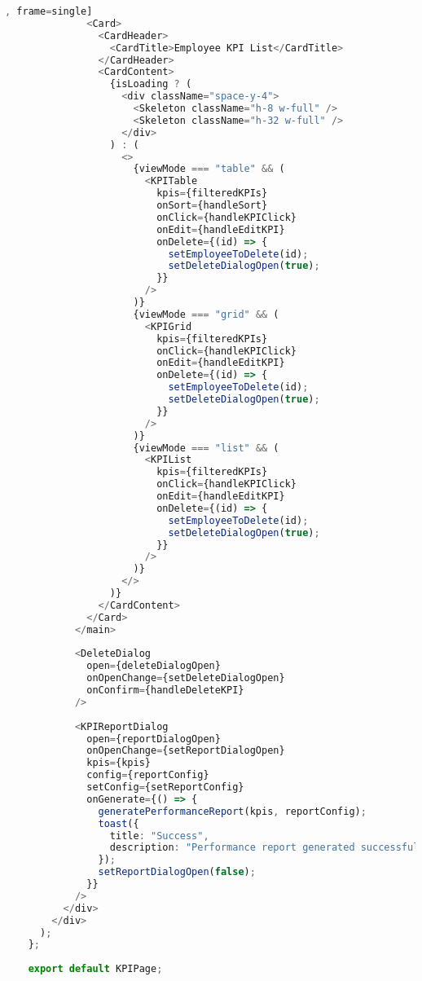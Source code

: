 \begin{lstlisting}[language=Typescript, caption=src/app/protected/kpi/page.tsx [front-end], frame=single]
              <Card>
                <CardHeader>
                  <CardTitle>Employee KPI List</CardTitle>
                </CardHeader>
                <CardContent>
                  {isLoading ? (
                    <div className="space-y-4">
                      <Skeleton className="h-8 w-full" />
                      <Skeleton className="h-32 w-full" />
                    </div>
                  ) : (
                    <>
                      {viewMode === "table" && (
                        <KPITable
                          kpis={filteredKPIs}
                          onSort={handleSort}
                          onClick={handleKPIClick}
                          onEdit={handleEditKPI}
                          onDelete={(id) => {
                            setEmployeeToDelete(id);
                            setDeleteDialogOpen(true);
                          }}
                        />
                      )}
                      {viewMode === "grid" && (
                        <KPIGrid
                          kpis={filteredKPIs}
                          onClick={handleKPIClick}
                          onEdit={handleEditKPI}
                          onDelete={(id) => {
                            setEmployeeToDelete(id);
                            setDeleteDialogOpen(true);
                          }}
                        />
                      )}
                      {viewMode === "list" && (
                        <KPIList
                          kpis={filteredKPIs}
                          onClick={handleKPIClick}
                          onEdit={handleEditKPI}
                          onDelete={(id) => {
                            setEmployeeToDelete(id);
                            setDeleteDialogOpen(true);
                          }}
                        />
                      )}
                    </>
                  )}
                </CardContent>
              </Card>
            </main>
    
            <DeleteDialog
              open={deleteDialogOpen}
              onOpenChange={setDeleteDialogOpen}
              onConfirm={handleDeleteKPI}
            />
    
            <KPIReportDialog
              open={reportDialogOpen}
              onOpenChange={setReportDialogOpen}
              kpis={kpis}
              config={reportConfig}
              setConfig={setReportConfig}
              onGenerate={() => {
                generatePerformanceReport(kpis, reportConfig);
                toast({
                  title: "Success",
                  description: "Performance report generated successfully as PDF.",
                });
                setReportDialogOpen(false);
              }}
            />
          </div>
        </div>
      );
    };
    
    export default KPIPage;
    
\end{lstlisting}

